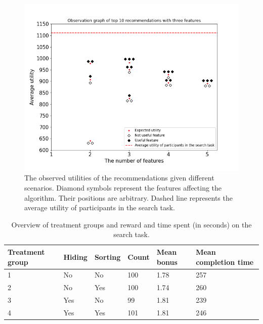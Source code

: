 \documentclass[a4paper,12pt]{article}
\begin{document}
\begin{figure}
    \centering
    \includegraphics[width=0.99\linewidth]{staticFiles/ThreeFeaturesObservedTop10SUMutility.png}
    \caption{The observed utilities of the recommendations given different scenarios. Diamond symbols represent the features affecting the algorithm. Their positions are arbitrary. Dashed line represents the average utility of participants in the search task.}
    \label{fig:actualRecommendationPerformance}
\end{figure}


\begin{table}[ht]
\centering
\begin{tabular}{p{2cm}lllp{2cm}p{2.5cm}}
\hline
\textbf{Treatment group} & \textbf{Hiding} & \textbf{Sorting} & \textbf{Count} & \textbf{Mean bonus} & \textbf{Mean completion time} \\ \hline
1                        & No               & No              & 100           & 1.78               & 257                          \\
2                        & No              & Yes              & 100           & 1.74               & 260                          \\
3                        & Yes               & No             & 99           & 1.81               & 239                          \\
4                        & Yes              & Yes             & 101           & 1.81               & 246                          \\ \hline
\end{tabular}
\caption{Overview of treatment groups and reward and time spent (in seconds) on the search task.}
\label{tab:rewardandcompletion}
\end{table}
\end{document}
